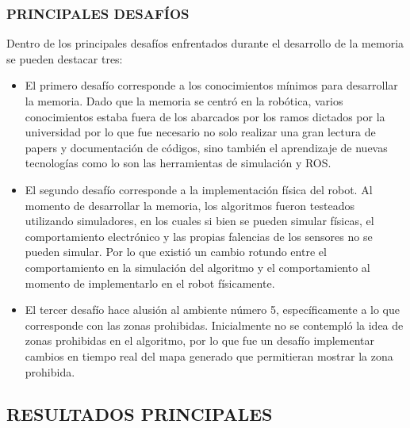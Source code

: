 \subsubsection{PRINCIPALES DESAFÍOS}
Dentro de los principales desafíos enfrentados durante el desarrollo de la memoria  se pueden destacar tres:
\begin{itemize}
    \item El primero desafío corresponde a los conocimientos mínimos para desarrollar la memoria. Dado que la memoria se centró en la robótica, varios conocimientos estaba fuera de los abarcados por los ramos dictados por la universidad por lo que fue necesario no solo realizar una gran lectura de papers y documentación de códigos, sino también el aprendizaje de nuevas tecnologías como lo son las herramientas de simulación y ROS.
    \item El segundo desafío corresponde a la implementación física del robot. Al momento de desarrollar la memoria, los algoritmos fueron testeados utilizando simuladores, en los cuales si bien se pueden simular físicas, el comportamiento electrónico y las propias falencias de los sensores no se pueden simular. Por lo que existió un cambio rotundo entre el comportamiento en la simulación del algoritmo y el comportamiento al momento de implementarlo en el robot físicamente.
    \item El tercer desafío hace alusión al ambiente número 5, específicamente a lo que corresponde con las zonas prohibidas. Inicialmente no se contempló la idea de zonas prohibidas en el algoritmo, por lo que fue un desafío implementar cambios en tiempo real del mapa generado que permitieran mostrar la zona prohibida.
\end{itemize}

\subsection{RESULTADOS PRINCIPALES}

